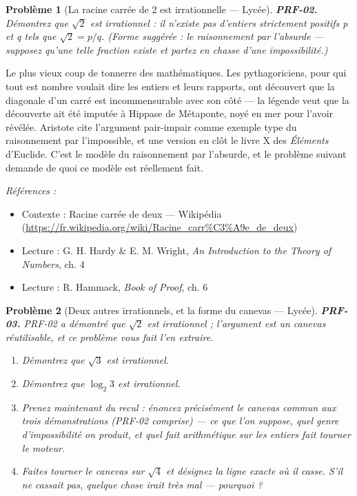 \documentclass[11pt]{article}
\newtheorem{problem}{Problème}
\newenvironment{refs}{\par\small\noindent\emph{Références :}\begin{itemize}\setlength\itemsep{0pt}}{\end{itemize}\normalsize}
\begin{document}
\bigskip

\begin{problem}[{La racine carrée de 2 est irrationnelle --- Lycée}]
\textbf{PRF-02.} Démontrez que $ \sqrt{2} $ est irrationnel : il
n'existe pas d'entiers strictement positifs p et q tels que $ \sqrt{2} = p/q $. (Forme
suggérée : le raisonnement par l'absurde --- supposez qu'une telle fraction existe et partez
en chasse d'une impossibilité.)
\end{problem}

\noindent Le plus vieux coup de tonnerre des mathématiques. Les pythagoriciens, pour
qui \og{} tout est nombre \fg{} voulait dire les entiers et leurs rapports, ont découvert que la
diagonale d'un carré est incommensurable avec son côté --- la légende veut que la découverte
ait été imputée à Hippase de Métaponte, noyé en mer pour l'avoir révélée. Aristote cite
l'argument pair-impair comme exemple type du raisonnement par l'impossible, et une version
en clôt le livre X des \textit{Éléments} d'Euclide. C'est le modèle du raisonnement par
l'absurde, et le problème suivant demande de quoi ce modèle est réellement fait.

\begin{refs}
\item Contexte : Racine carrée de deux --- Wikipédia (\url{https://fr.wikipedia.org/wiki/Racine_carr%C3%A9e_de_deux})
\item Lecture : G. H. Hardy \& E. M. Wright, \textit{An Introduction to the Theory of Numbers}, ch. 4
\item Lecture : R. Hammack, \textit{Book of Proof}, ch. 6
\end{refs}

\bigskip

\begin{problem}[{Deux autres irrationnels, et la forme du canevas --- Lycée}]
\textbf{PRF-03.} PRF-02 a démontré que $ \sqrt{2} $ est irrationnel ; l'argument
est un canevas réutilisable, et ce problème vous fait l'en extraire.
\begin{enumerate}
\item[(a)] Démontrez que $ \sqrt{3} $ est irrationnel.
\item[(b)] Démontrez que $ \log_2 3 $ est irrationnel.
\item[(c)] Prenez maintenant du recul : énoncez précisément le canevas commun aux trois
démonstrations (PRF-02 comprise) --- ce que l'on suppose, quel genre d'impossibilité on
produit, et quel fait arithmétique sur les entiers fait tourner le moteur.
\item[(d)] Faites tourner le canevas sur $ \sqrt{4} $ et désignez la ligne exacte où il casse.
S'il ne cassait pas, quelque chose irait très mal --- pourquoi ?
\end{enumerate}

\end{problem}
\end{document}
